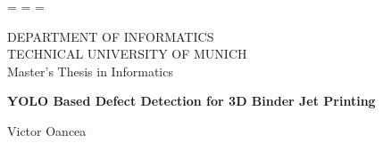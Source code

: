 \begin{titlepage}
  \oddsidemargin=\evensidemargin\relax
  \textwidth=\dimexpr{}\evensidemargin-2in\relax
  \hsize=\textwidth\relax

  \centering


  \vspace{5mm}
  {\huge\MakeUppercase{Department of Informatics}}\\

  \vspace{5mm}
  {\large\MakeUppercase{Technical University of Munich}}\\

  \vspace{20mm}
  {\Large Master's Thesis in Informatics}

  \vspace{15mm}
  {\huge\bfseries {YOLO Based Defect Detection for 3D Binder Jet Printing} \par}

  \vspace{15mm}
  {\LARGE Victor Oancea}

\end{titlepage}
